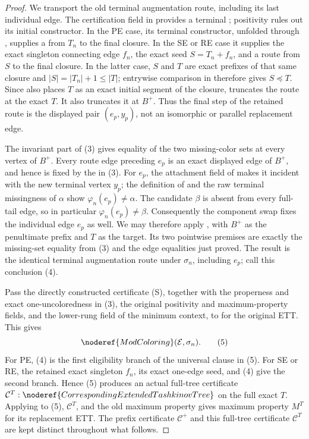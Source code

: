 \begin{proof}
We transport the old terminal augmentation route, including its last
individual edge.  The certification field in 
provides a terminal ; positivity rules out
its initial constructor.  In the PE case, its terminal constructor,
unfolded through , supplies a
 from \(T_n\) to the final closure.
In the SE or RE case it supplies the exact singleton connecting edge
\(f_n\), the exact seed \(S=T_n+f_n\), and a route from \(S\) to the final
closure.  In the latter case, \(S\) and \(T\) are exact prefixes of that
same closure and \(|S|=|T_n|+1\leq |T|\); entrywise comparison in
 therefore gives \(S\preccurlyeq T\).
Since  also places \(T\) as an exact
initial segment of the closure,
 truncates the route at
the exact \(T\).  It also truncates it at \(B^+\).  Thus the final step of
the retained route is the displayed pair \((e_p,y_p)\), not an isomorphic
or parallel replacement edge.

The invariant part of (3) gives equality of the two missing-color sets at
every vertex of \(B^+\).  Every route edge preceding \(e_p\) is an exact
displayed edge of \(B^+\), and hence is fixed by the
 in (3).  For \(e_p\), the attachment
field of  makes it incident with the new terminal
vertex \(y_p\); the definition of  and the raw
terminal missingness of \(\alpha\) show
\(\varphi_n(e_p)\ne\alpha\).  The candidate \(\beta\) is absent from every
full-tail edge, so in particular
\(\varphi_n(e_p)\ne\beta\).  Consequently the component swap fixes the
individual edge \(e_p\) as well.  We may therefore apply
, with \(B^+\) as
the penultimate prefix and \(T\) as the target.  Its two pointwise premises
are exactly the missing-set equality from (3) and the edge equalities just
proved.  The result is the identical terminal augmentation route under
\(\sigma_n\), including \(e_p\); call this conclusion (4).

Pass the directly constructed certificate (S), together with the
properness and exact one-uncoloredness in (3), the original positivity and
maximum-property fields, and the lower-rung field of the minimum context,
to  for the original ETT.  This gives
\[
                 \noderef{ModColoring}(\mathcal E,\sigma_n).   \tag{5}
\]
For PE, (4) is the first eligibility branch of the universal clause in
(5).  For SE or RE, the retained exact singleton \(f_n\), its exact
one-edge seed, and (4) give the second branch.  Hence (5) produces an
actual full-tree certificate
\(\mathcal C^T:\noderef{CorrespondingExtendedTashkinovTree}\) on the full
exact \(T\).  Applying  to (5),
\(\mathcal C^T\), and the old maximum property gives maximum property
\(M^T\) for its replacement ETT.  The prefix certificate
\(\mathcal C^+\) and this full-tree certificate \(\mathcal C^T\) are kept
distinct throughout what follows.


\end{proof}
